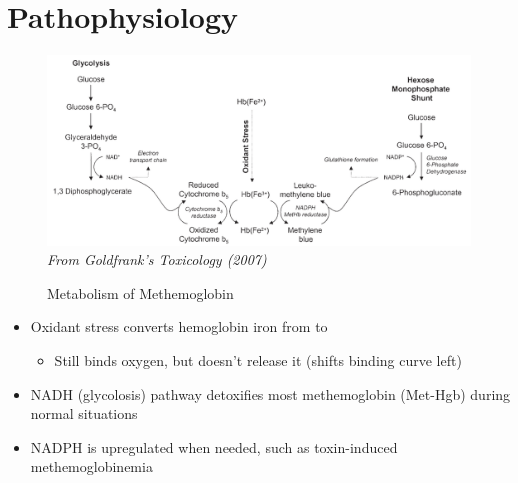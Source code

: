 \documentclass[main.tex]{subfiles}
\begin{document}
	
\section{Pathophysiology}
	
\begin{figure}[H]
	\centering
	\caption{Metabolism of Methemoglobin}
	\label{img:methgb-Metabolism}
	\includegraphics[width=\linewidth]{img/methemoglobinemia/metabolism.png}
	\raggedleft \footnotesize \textit{From Goldfrank's Toxicology (2007)}
\end{figure}

\begin{itemize}[noitemsep]
	\item Oxidant stress converts hemoglobin iron from  to 
	\begin{itemize}[noitemsep]
		\item Still binds oxygen, but doesn't release it (shifts binding curve left)
	\end{itemize}
	\item NADH (glycolosis) pathway detoxifies most methemoglobin (Met-Hgb) during normal situations
	\item NADPH is upregulated when needed, such as toxin-induced methemoglobinemia
\end{itemize}
\end{document}
